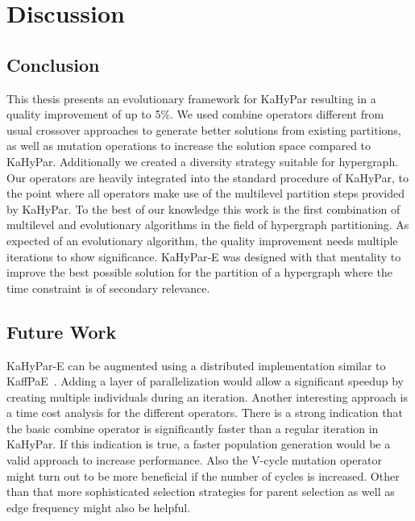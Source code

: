 \documentclass[a4paper,12pt,titlepage, BCOR7mm,headsepline]{scrbook}
\numberwithin{equation}{section}
\begin{document}
\chapter{Discussion}
\label{chapter:discussion}

\section{Conclusion}
This thesis presents an evolutionary framework for KaHyPar resulting in a quality improvement of up to 5\%. We used combine operators different from usual crossover approaches to generate better solutions from existing partitions, as well as mutation operations to increase the solution space compared to KaHyPar. Additionally we created a diversity strategy suitable for hypergraph. Our operators are heavily integrated into the standard procedure of KaHyPar, to the point where all operators make use of the multilevel partition steps provided by KaHyPar. To the best of our knowledge this work is the first combination of multilevel and evolutionary algorithms in the field of hypergraph partitioning.
As expected of an evolutionary algorithm, the quality improvement needs multiple iterations to show significance. KaHyPar-E was designed with that mentality to improve the best possible solution for the partition of a hypergraph where the time constraint is of secondary relevance. 
\section{Future Work}
KaHyPar-E can be augmented using a distributed implementation similar to KaffPaE~\cite{sanders2012distributed}. Adding a layer of parallelization would allow a significant speedup by creating multiple individuals during an iteration. Another interesting approach is a time cost analysis for the different operators. There is a strong indication that the basic combine operator is significantly faster than a regular iteration in KaHyPar. If this indication is true, a faster population generation would be a valid approach to increase performance. Also the V-cycle mutation operator might turn out to be more beneficial if the number of cycles is increased. Other than that more sophisticated selection strategies for parent selection as well as edge frequency might also be helpful. %
\end{document}

